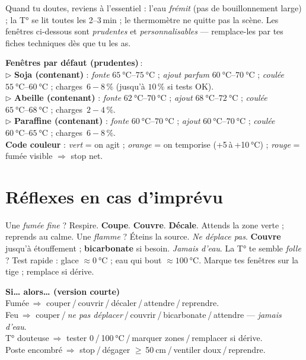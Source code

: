 \documentclass[../../main.tex]{subfiles}
\begin{document}
Quand tu doutes, reviens à l’essentiel : l’eau \textit{frémit} (pas de bouillonnement large) ; la T° se lit toutes les 2–3 min ; le thermomètre ne quitte pas la scène. Les fenêtres ci-dessous sont \textit{prudentes} et \textit{personnalisables} — remplace-les par tes fiches techniques dès que tu les as.

\begin{BlocControles}
\textbf{Fenêtres par défaut (prudentes)} : \\
\(\triangleright\) \textbf{Soja (contenant)} : \textit{fonte} \(\SIrange{65}{75}{\celsius}\) ; \textit{ajout parfum} \(\SIrange{60}{70}{\celsius}\) ; \textit{coulée} \(\SIrange{55}{60}{\celsius}\) ; charges \(\,6{-}8\,\%\) (jusqu’à \(10\,\%\) si tests OK). \\
\(\triangleright\) \textbf{Abeille (contenant)} : \textit{fonte} \(\SIrange{62}{70}{\celsius}\) ; \textit{ajout} \(\SIrange{68}{72}{\celsius}\) ; \textit{coulée} \(\SIrange{65}{68}{\celsius}\) ; charges \(\,2{-}4\,\%\). \\
\(\triangleright\) \textbf{Paraffine (contenant)} : \textit{fonte} \(\SIrange{60}{70}{\celsius}\) ; \textit{ajout} \(\SIrange{60}{70}{\celsius}\) ; \textit{coulée} \(\SIrange{60}{65}{\celsius}\) ; charges \(\,6{-}8\,\%\). \\
\textbf{Code couleur} : \textit{vert} = on agit ; \textit{orange} = on temporise (+5 à +10 °C) ; \textit{rouge} = fumée visible \(\Rightarrow\) stop net.
\end{BlocControles}

\section{Réflexes en cas d’imprévu}

Une \textit{fumée fine} ? Respire. \textbf{Coupe}. \textbf{Couvre}. \textbf{Décale}. Attends la zone verte ; reprends au calme.
Une \textit{flamme} ? Éteins la source. \textit{Ne déplace pas}. \textbf{Couvre} jusqu’à étouffement ; \textbf{bicarbonate} si besoin. \textit{Jamais d’eau}.
La T° te semble \textit{folle} ? Test rapide : glace \(\approx \SI{0}{\celsius}\) ; eau qui bout \(\approx \SI{100}{\celsius}\). Marque tes fenêtres sur la tige ; remplace si dérive.

\begin{BlocDepannage}
\textbf{Si… alors… (version courte)} \\
Fumée \(\Rightarrow\) couper / couvrir / décaler / attendre / reprendre. \\
Feu \(\Rightarrow\) couper / \textit{ne pas déplacer} / couvrir / bicarbonate / attendre — \textit{jamais d’eau}. \\
T° douteuse \(\Rightarrow\) tester 0 / 100 °C / marquer zones / remplacer si dérive. \\
Poste encombré \(\Rightarrow\) stop / dégager \(\geq\) 50 cm / ventiler doux / reprendre.
\end{BlocDepannage}
\end{document}
